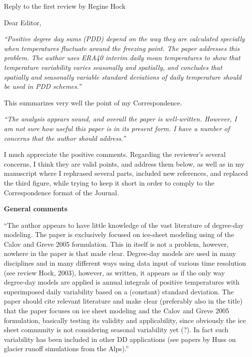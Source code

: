 \documentclass{letter}
\newcommand{\rev}[0]{\color{blue!50!black}\it}
\newcommand{\textrev}[1]{{\rev``#1''}}
\newcommand{\revpoint}[1]{{\rev\item``#1''}\\}
\begin{document}
\begin{letter}{Reply to the first review by Regine Hock}

\opening{Dear Editor,}

\textrev{Positive degree day sums (PDD) depend on the way they are calculated specially when temperatures fluctuate around the freezing point. The paper addresses this problem. The author uses ERA40 interim daily mean temperatures to show that temperature variability varies seasonally and spatially, and concludes that spatially and seasonally variable standard deviations of daily temperature should be used in PDD schemes.}

This summarizes very well the point of my Correspondence.

\textrev{The analysis appears sound, and overall the paper is well-written. However, I am not sure how useful this paper is in its present form. I have a number of concerns that the author should address.}

I much appreciate the positive comments. Regarding the reviewer's several concerns, I think they are valid points, and address them below, as well as in my manuscript where I rephrased several parts, included new references, and replaced the third figure, while trying to keep it short in order to comply to the Correspondence format of the Journal.


\textbf{General comments}

\begin{enumerate}[resume]

    \revpoint{The author appears to have little knowledge of the vast literature of degree-day modeling. The paper is exclusively focused on ice-sheet modeling using of the Calov and Greve 2005 formulation. This in itself is not a problem, however, nowhere in the paper is that made clear. Degree-day models are used in many disciplines and in many different ways using data input of various time resolution (see review Hock, 2003), however, as written, it appears as if the only way degree-day models are applied is annual integrals of positive temperatures with superimposed daily variability based on a (constant) standard deviation. The paper should cite relevant literature and make clear (preferably also in the title) that the paper focuses on ice sheet modeling and the Calov and Greve 2005 formulation, basically testing its validity and applicability, since obviously the ice sheet community is not considering seasonal variability yet (?). In fact such variability has been included in other DD applications (see papers by Huss on glacier runoff simulations from the Alps).}


\end{enumerate}
\end{letter}
\end{document}
